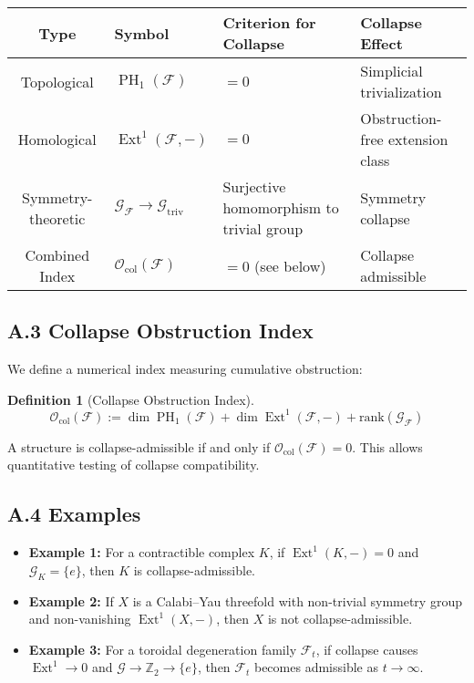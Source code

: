 \documentclass[11pt]{article}
\newtheorem{definition}[theorem]{Definition}
\DeclareMathOperator{\Ext}{Ext}
\DeclareMathOperator{\PH}{PH}
\begin{document}
\vspace{0.5em}
\begin{center}
\begin{tabular}{|c|l|l|l|}
\hline
\textbf{Type} & \textbf{Symbol} & \textbf{Criterion for Collapse} & \textbf{Collapse Effect} \\
\hline
Topological & $\PH_1(\mathcal{F})$ & $= 0$ & Simplicial trivialization \\
\hline
Homological & $\Ext^1(\mathcal{F}, -)$ & $= 0$ & Obstruction-free extension class \\
\hline
Symmetry-theoretic & $\mathcal{G}_{\mathcal{F}} \rightarrow \mathcal{G}_{\mathrm{triv}}$ & Surjective homomorphism to trivial group & Symmetry collapse \\
\hline
Combined Index & $\mathcal{O}_{\mathrm{col}}(\mathcal{F})$ & $= 0$ (see below) & Collapse admissible \\
\hline
\end{tabular}
\end{center}
\vspace{0.5em}

\subsection*{A.3 Collapse Obstruction Index}

We define a numerical index measuring cumulative obstruction:

\begin{definition}[Collapse Obstruction Index]
\[
\mathcal{O}_{\mathrm{col}}(\mathcal{F}) := \dim \PH_1(\mathcal{F}) + \dim \Ext^1(\mathcal{F}, -) + \mathrm{rank}(\mathcal{G}_{\mathcal{F}})
\]
\end{definition}

A structure is collapse-admissible if and only if $\mathcal{O}_{\mathrm{col}}(\mathcal{F}) = 0$. This allows quantitative testing of collapse compatibility.

\subsection*{A.4 Examples}

\begin{itemize}
    \item \textbf{Example 1:} For a contractible complex $K$, if $\Ext^1(K, -) = 0$ and $\mathcal{G}_K = \{e\}$, then $K$ is collapse-admissible.
    \item \textbf{Example 2:} If $X$ is a Calabi–Yau threefold with non-trivial symmetry group and non-vanishing $\Ext^1(X, -)$, then $X$ is not collapse-admissible.
    \item \textbf{Example 3:} For a toroidal degeneration family $\mathcal{F}_t$, if collapse causes $\Ext^1 \to 0$ and $\mathcal{G} \to \mathbb{Z}_2 \to \{e\}$, then $\mathcal{F}_t$ becomes admissible as $t \to \infty$.
\end{itemize}
\end{document}
